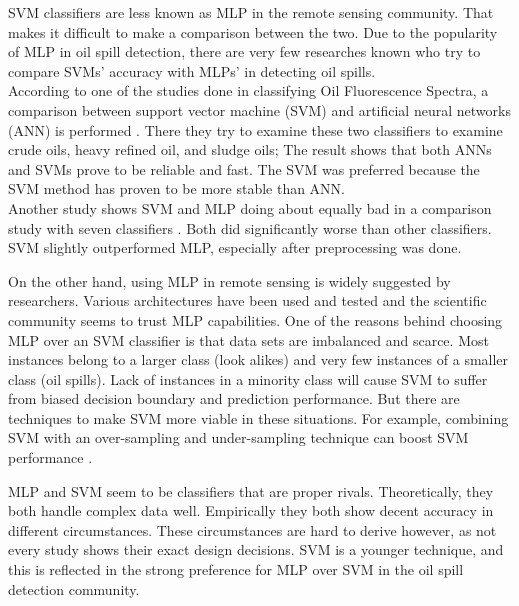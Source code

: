 SVM classifiers are less known as MLP in the remote sensing community. That makes it difficult to make a comparison between the two. Due to the popularity of MLP in oil spill detection, there are very few researches known who try to compare SVMs' accuracy with MLPs' in detecting oil spills.\\ 

According to one of the studies done in classifying Oil Fluorescence Spectra, a comparison between support vector machine (SVM) and artificial neural networks (ANN) is performed \cite{almhdi2007classification}. There they try to examine these two classifiers to examine crude oils, heavy refined oil, and sludge oils; The result shows that both ANNs and SVMs prove to be reliable and fast. The SVM was preferred because the SVM method has proven to be more stable than ANN.\\

Another study shows SVM and MLP doing about equally bad in a comparison study with seven classifiers \cite{Xu201414}. Both did significantly worse than other classifiers. SVM slightly outperformed MLP, especially after preprocessing was done. 

On the other hand, using MLP in remote sensing is widely suggested by researchers\cite{Mera201472,Brekke200595,fingas2014review}. Various architectures have been used and tested and the scientific community seems to trust MLP capabilities. One of the reasons behind choosing MLP over an SVM classifier is that data sets are imbalanced and scarce. Most instances belong to a larger class (look alikes) and very few instances of a smaller class (oil spills). Lack of instances in a minority class will cause SVM to suffer from biased decision boundary and prediction performance. But there are techniques to make SVM more viable in these situations. For example, combining SVM with an over-sampling and under-sampling technique can boost SVM performance \cite{liu2006boosting}.

MLP and SVM seem to be classifiers that are proper rivals. Theoretically, they both handle complex data well. Empirically they both show decent accuracy in different circumstances. These circumstances are hard to derive however, as not every study shows their exact design decisions. SVM is a younger technique, and this is reflected in the strong preference for MLP over SVM in the oil spill detection community. 